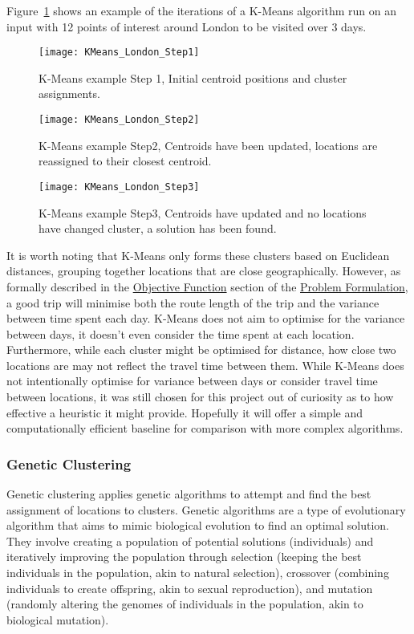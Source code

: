 \noindent
Figure~\ref{fig:KMeans_London_Step1} shows an example of the iterations of a K-Means algorithm run on an input with
12 points of interest around London to be visited over 3 days.
\begin{figure}[H]
    \ContinuedFloat*
    \texttt{[image: KMeans\_London\_Step1]}
    \caption{K-Means example Step 1, Initial centroid positions and cluster assignments.}
    \label{fig:KMeans_London_Step1}
\end{figure}
\begin{figure}[H]
    \ContinuedFloat
    \texttt{[image: KMeans\_London\_Step2]}
    \caption{K-Means example Step2, Centroids have been updated, locations are reassigned to their closest centroid.}
    \label{fig:KMeans_London_Step2}
\end{figure}
\begin{figure}[H]
    \ContinuedFloat
    \texttt{[image: KMeans\_London\_Step3]}
    \caption{K-Means example Step3, Centroids have updated and no locations have changed cluster, a solution has been found.}
    \label{fig:KMeans_London_Step3}
\end{figure}

\noindent
It is worth noting that K-Means only forms these clusters based on Euclidean distances, grouping together locations
that are close geographically.
However, as formally described in the \hyperref[subsec:objective-function]{Objective Function} section of the
\hyperref[sec:problem-formulation]{Problem Formulation}, a good trip will minimise both the route length of the trip
and the variance between time spent each day.
K-Means does not aim to optimise for the variance between days, it doesn't even consider the time spent at each
location.
Furthermore, while each cluster might be optimised for distance, how close two locations are may not reflect the travel
time between them.
While K-Means does not intentionally optimise for variance between days or consider travel time between locations, it
was still chosen for this project out of curiosity as to how effective a heuristic it might provide.
Hopefully it will offer a simple and computationally efficient baseline for comparison with more complex
algorithms.

\subsubsection{Genetic Clustering}
Genetic clustering applies genetic algorithms to attempt and find the best assignment of locations to clusters.
Genetic algorithms are a type of evolutionary algorithm that aims to mimic biological evolution to find an optimal
solution.
They involve creating a population of potential solutions (individuals) and iteratively improving the population
through selection (keeping the best individuals in the population, akin to natural selection), crossover (combining
individuals to create offspring, akin to sexual reproduction), and mutation (randomly altering the genomes
of individuals in the population, akin to biological mutation).

